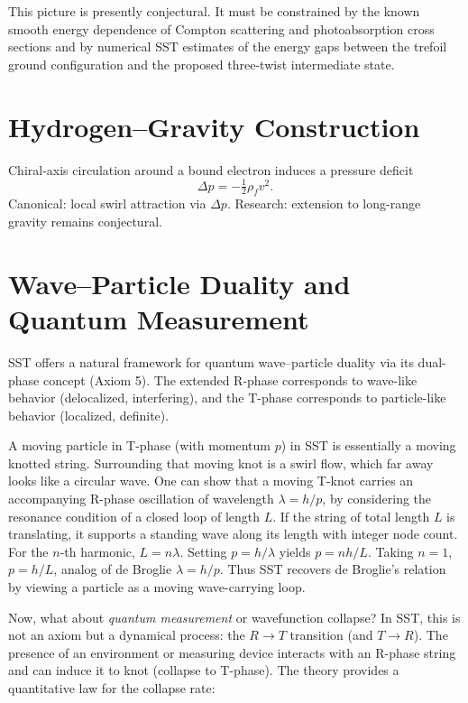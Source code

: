 \documentclass[10pt,reprint,aps,onecolumn,nofootinbib]{revtex4-2}
\newcommand{\rhof}{\rho_{\!f}}                           %
\begin{document}
        This picture is presently conjectural.  It must be constrained by the
        known smooth energy dependence of Compton scattering and
        photoabsorption cross sections and by numerical SST estimates of the
        energy gaps between the trefoil ground configuration and the proposed
        three-twist intermediate state.


    \section{Hydrogen--Gravity Construction}\label{canon58:hydro-grav}
    Chiral-axis circulation around a bound electron induces a pressure deficit
    \[
        \Delta p = -\tfrac12 \rhof v^2.
    \]
    Canonical: local swirl attraction via $\Delta p$. %
    Research: extension to long-range gravity remains conjectural. %


    \section{Wave–Particle Duality and Quantum Measurement}
    SST offers a natural framework for quantum wave–particle duality via its dual-phase concept (Axiom 5). The extended R-phase corresponds to wave-like behavior (delocalized, interfering), and the T-phase corresponds to particle-like behavior (localized, definite).

    A moving particle in T-phase (with momentum $p$) in SST is essentially a moving knotted string. Surrounding that moving knot is a swirl flow, which far away looks like a circular wave. One can show that a moving T-knot carries an accompanying R-phase oscillation of wavelength $\lambda = h/p$, by considering the resonance condition of a closed loop of length $L$. If the string of total length $L$ is translating, it supports a standing wave along its length with integer node count. For the $n$-th harmonic, $L = n \lambda$. Setting $p = h/\lambda$ yields $p = n h/L$. Taking $n=1$, $p = h/L$, analog of de Broglie $\lambda = h/p$. Thus SST recovers de Broglie’s relation by viewing a particle as a moving wave-carrying loop.

    Now, what about \emph{quantum measurement} or wavefunction collapse? In SST, this is not an axiom but a dynamical process: the $R\to T$ transition (and $T\to R$). The presence of an environment or measuring device interacts with an R-phase string and can induce it to knot (collapse to T-phase). The theory provides a quantitative law for the collapse rate:
\end{document}
